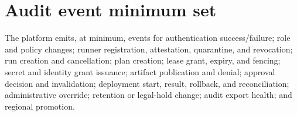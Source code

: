 \section{Audit event minimum set}

The platform emits, at minimum, events for authentication success/failure; role and
policy changes; runner registration, attestation, quarantine, and revocation; run
creation and cancellation; plan creation; lease grant, expiry, and fencing; secret and
identity grant issuance; artifact publication and denial; approval decision and
invalidation; deployment start, result, rollback, and reconciliation; administrative
override; retention or legal-hold change; audit export health; and regional promotion.
